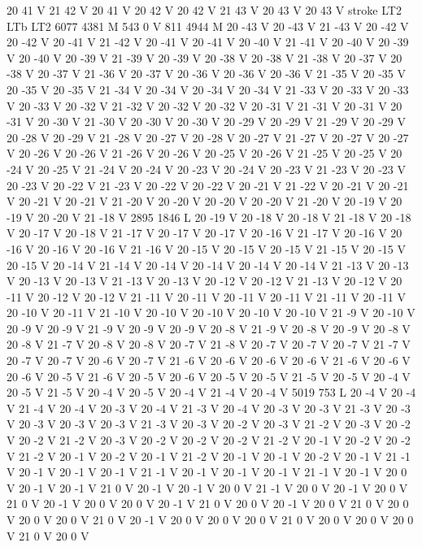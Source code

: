 {{{{{20 41 V
21 42 V
20 41 V
20 42 V
20 42 V
21 43 V
20 43 V
20 43 V
stroke
LT2
LTb
LT2
6077 4381 M
543 0 V
811 4944 M
20 -43 V
20 -43 V
21 -43 V
20 -42 V
20 -42 V
20 -41 V
21 -42 V
20 -41 V
20 -41 V
20 -40 V
21 -41 V
20 -40 V
20 -39 V
20 -40 V
20 -39 V
21 -39 V
20 -39 V
20 -38 V
20 -38 V
21 -38 V
20 -37 V
20 -38 V
20 -37 V
21 -36 V
20 -37 V
20 -36 V
20 -36 V
20 -36 V
21 -35 V
20 -35 V
20 -35 V
20 -35 V
21 -34 V
20 -34 V
20 -34 V
20 -34 V
21 -33 V
20 -33 V
20 -33 V
20 -33 V
20 -32 V
21 -32 V
20 -32 V
20 -32 V
20 -31 V
21 -31 V
20 -31 V
20 -31 V
20 -30 V
21 -30 V
20 -30 V
20 -30 V
20 -29 V
20 -29 V
21 -29 V
20 -29 V
20 -28 V
20 -29 V
21 -28 V
20 -27 V
20 -28 V
20 -27 V
21 -27 V
20 -27 V
20 -27 V
20 -26 V
20 -26 V
21 -26 V
20 -26 V
20 -25 V
20 -26 V
21 -25 V
20 -25 V
20 -24 V
20 -25 V
21 -24 V
20 -24 V
20 -23 V
20 -24 V
20 -23 V
21 -23 V
20 -23 V
20 -23 V
20 -22 V
21 -23 V
20 -22 V
20 -22 V
20 -21 V
21 -22 V
20 -21 V
20 -21 V
20 -21 V
20 -21 V
21 -20 V
20 -20 V
20 -20 V
20 -20 V
21 -20 V
20 -19 V
20 -19 V
20 -20 V
21 -18 V
2895 1846 L
20 -19 V
20 -18 V
20 -18 V
21 -18 V
20 -18 V
20 -17 V
20 -18 V
21 -17 V
20 -17 V
20 -17 V
20 -16 V
21 -17 V
20 -16 V
20 -16 V
20 -16 V
20 -16 V
21 -16 V
20 -15 V
20 -15 V
20 -15 V
21 -15 V
20 -15 V
20 -15 V
20 -14 V
21 -14 V
20 -14 V
20 -14 V
20 -14 V
20 -14 V
21 -13 V
20 -13 V
20 -13 V
20 -13 V
21 -13 V
20 -13 V
20 -12 V
20 -12 V
21 -13 V
20 -12 V
20 -11 V
20 -12 V
20 -12 V
21 -11 V
20 -11 V
20 -11 V
20 -11 V
21 -11 V
20 -11 V
20 -10 V
20 -11 V
21 -10 V
20 -10 V
20 -10 V
20 -10 V
20 -10 V
21 -9 V
20 -10 V
20 -9 V
20 -9 V
21 -9 V
20 -9 V
20 -9 V
20 -8 V
21 -9 V
20 -8 V
20 -9 V
20 -8 V
20 -8 V
21 -7 V
20 -8 V
20 -8 V
20 -7 V
21 -8 V
20 -7 V
20 -7 V
20 -7 V
21 -7 V
20 -7 V
20 -7 V
20 -6 V
20 -7 V
21 -6 V
20 -6 V
20 -6 V
20 -6 V
21 -6 V
20 -6 V
20 -6 V
20 -5 V
21 -6 V
20 -5 V
20 -6 V
20 -5 V
20 -5 V
21 -5 V
20 -5 V
20 -4 V
20 -5 V
21 -5 V
20 -4 V
20 -5 V
20 -4 V
21 -4 V
20 -4 V
5019 753 L
20 -4 V
20 -4 V
21 -4 V
20 -4 V
20 -3 V
20 -4 V
21 -3 V
20 -4 V
20 -3 V
20 -3 V
21 -3 V
20 -3 V
20 -3 V
20 -3 V
20 -3 V
21 -3 V
20 -3 V
20 -2 V
20 -3 V
21 -2 V
20 -3 V
20 -2 V
20 -2 V
21 -2 V
20 -3 V
20 -2 V
20 -2 V
20 -2 V
21 -2 V
20 -1 V
20 -2 V
20 -2 V
21 -2 V
20 -1 V
20 -2 V
20 -1 V
21 -2 V
20 -1 V
20 -1 V
20 -2 V
20 -1 V
21 -1 V
20 -1 V
20 -1 V
20 -1 V
21 -1 V
20 -1 V
20 -1 V
20 -1 V
21 -1 V
20 -1 V
20 0 V
20 -1 V
20 -1 V
21 0 V
20 -1 V
20 -1 V
20 0 V
21 -1 V
20 0 V
20 -1 V
20 0 V
21 0 V
20 -1 V
20 0 V
20 0 V
20 -1 V
21 0 V
20 0 V
20 -1 V
20 0 V
21 0 V
20 0 V
20 0 V
20 0 V
21 0 V
20 -1 V
20 0 V
20 0 V
20 0 V
21 0 V
20 0 V
20 0 V
20 0 V
21 0 V
20 0 V
}}}}}

